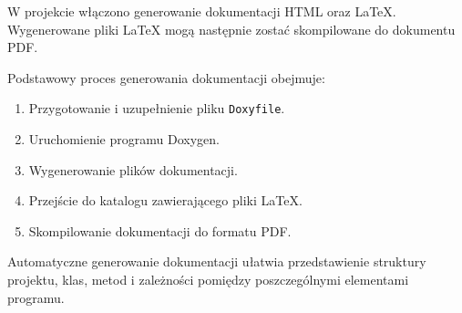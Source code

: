 W projekcie włączono generowanie dokumentacji HTML oraz LaTeX.
Wygenerowane pliki LaTeX mogą następnie zostać skompilowane
do dokumentu PDF.

Podstawowy proces generowania dokumentacji obejmuje:

\begin{enumerate}
    \item Przygotowanie i uzupełnienie pliku \texttt{Doxyfile}.
    \item Uruchomienie programu Doxygen.
    \item Wygenerowanie plików dokumentacji.
    \item Przejście do katalogu zawierającego pliki LaTeX.
    \item Skompilowanie dokumentacji do formatu PDF.
\end{enumerate}

Automatyczne generowanie dokumentacji ułatwia przedstawienie
struktury projektu, klas, metod i zależności pomiędzy
poszczególnymi elementami programu.
